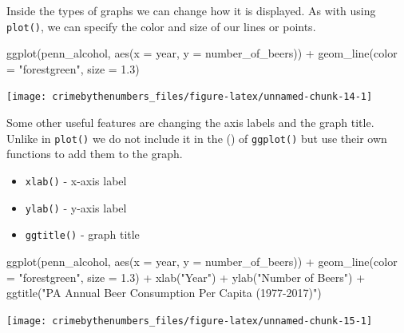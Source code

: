 \documentclass[
]{krantz}
\makeatletter
\newenvironment{Shaded}{\begin{snugshade}}{\end{snugshade}}
\newcommand{\AttributeTok}[1]{\textcolor[rgb]{0.61,0.61,0.61}{#1}}
\newcommand{\FloatTok}[1]{\textcolor[rgb]{0.06,0.06,0.06}{#1}}
\newcommand{\FunctionTok}[1]{\textcolor[rgb]{0,0,0}{#1}}
\newcommand{\NormalTok}[1]{#1}
\newcommand{\SpecialCharTok}[1]{\textcolor[rgb]{0,0,0}{#1}}
\newcommand{\StringTok}[1]{\textcolor[rgb]{0.5,0.5,0.5}{#1}}
\providecommand{\tightlist}{%
  \setlength{\itemsep}{0pt}\setlength{\parskip}{0pt}}
\newenvironment{kframe}{%
\medskip{}
\setlength{\fboxsep}{.8em}
 \def\at@end@of@kframe{}%
 \ifinner\ifhmode%
  \def\at@end@of@kframe{\end{minipage}}%
  \begin{minipage}{\columnwidth}%
 \fi\fi%
 \def\FrameCommand##1{\hskip\@totalleftmargin \hskip-\fboxsep
 \colorbox{shadecolor}{##1}\hskip-\fboxsep
     \hskip-\linewidth \hskip-\@totalleftmargin \hskip\columnwidth}%
 \MakeFramed {\advance\hsize-\width
   \@totalleftmargin\z@ \linewidth\hsize
   \@setminipage}}%
 {\par\unskip\endMakeFramed%
 \at@end@of@kframe}
\renewenvironment{Shaded}{\begin{kframe}}{\end{kframe}}
\makeatother
\begin{document}
Inside the types of graphs we can change how it is displayed. As with using \texttt{plot()}, we can specify the color and size of our lines or points.

\begin{Shaded}
\begin{Highlighting}[]
\FunctionTok{ggplot}\NormalTok{(penn\_alcohol, }\FunctionTok{aes}\NormalTok{(}\AttributeTok{x =}\NormalTok{ year, }\AttributeTok{y =}\NormalTok{ number\_of\_beers)) }\SpecialCharTok{+}
  \FunctionTok{geom\_line}\NormalTok{(}\AttributeTok{color =} \StringTok{"forestgreen"}\NormalTok{, }\AttributeTok{size =} \FloatTok{1.3}\NormalTok{)}
\end{Highlighting}
\end{Shaded}

\begin{center}\texttt{[image: crimebythenumbers\_files/figure-latex/unnamed-chunk-14-1]} \end{center}

Some other useful features are changing the axis labels and the graph title. Unlike in \texttt{plot()} we do not include it in the () of \texttt{ggplot()} but use their own functions to add them to the graph.

\begin{itemize}
\tightlist
\item
  \texttt{xlab()} - x-axis label
\item
  \texttt{ylab()} - y-axis label
\item
  \texttt{ggtitle()} - graph title
\end{itemize}

\begin{Shaded}
\begin{Highlighting}[]
\FunctionTok{ggplot}\NormalTok{(penn\_alcohol, }\FunctionTok{aes}\NormalTok{(}\AttributeTok{x =}\NormalTok{ year, }\AttributeTok{y =}\NormalTok{ number\_of\_beers)) }\SpecialCharTok{+}
  \FunctionTok{geom\_line}\NormalTok{(}\AttributeTok{color =} \StringTok{"forestgreen"}\NormalTok{, }\AttributeTok{size =} \FloatTok{1.3}\NormalTok{) }\SpecialCharTok{+}
  \FunctionTok{xlab}\NormalTok{(}\StringTok{"Year"}\NormalTok{) }\SpecialCharTok{+}
  \FunctionTok{ylab}\NormalTok{(}\StringTok{"Number of Beers"}\NormalTok{) }\SpecialCharTok{+}
  \FunctionTok{ggtitle}\NormalTok{(}\StringTok{"PA Annual Beer Consumption Per Capita (1977{-}2017)"}\NormalTok{)}
\end{Highlighting}
\end{Shaded}

\begin{center}\texttt{[image: crimebythenumbers\_files/figure-latex/unnamed-chunk-15-1]} \end{center}
\end{document}
